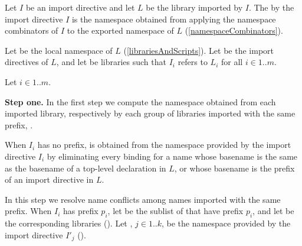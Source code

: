 \documentclass[makeidx]{article}
\begin{document}

\LMHash{}%
Let $I$ be an import directive and let $L$ be the library imported by $I$.
The
by the import directive $I$ is the namespace obtained from applying
the namespace combinators of $I$
to the exported namespace of $L$
(\ref{namespaceCombinators}).


\LMHash{}%
Let  be the local namespace of $L$
(\ref{librariesAndScripts}).
Let  be the import directives of $L$,
and let  be libraries
such that $I_i$ refers to $L_i$ for all $i \in 1 .. m$.

\LMHash{}%
Let $i \in 1 .. m$.

\LMHash{}%
{\bf Step one.}
In the first step we compute the namespace obtained from each imported library,
respectively by each group of libraries imported with the same prefix,
.

\LMHash{}%
When $I_i$ has no prefix,  is obtained
from the namespace provided by the import directive $I_i$
by eliminating every binding for a name whose basename is
the same as the basename of a top-level declaration in $L$,
or whose basename is the prefix of an import directive in $L$.

\EndCase

\LMHash{}%
In this step we resolve name conflicts
among names imported with the same prefix.
When $I_i$ has prefix $p_i$,
let  be the sublist of  that have prefix $p_i$,
and let  be the corresponding libraries
().
Let , $j \in 1 .. k$,
be the namespace provided by the import directive $I'_j$
().
\end{document}
